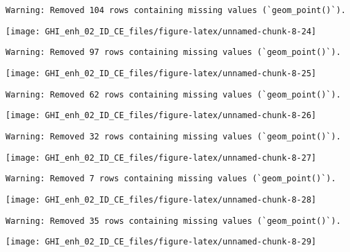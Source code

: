 \documentclass[
  10pt,
  a4paper,oneside]{article}
\begin{document}
\begin{verbatim}
Warning: Removed 104 rows containing missing values (`geom_point()`).
\end{verbatim}

\begin{center}\texttt{[image: GHI\_enh\_02\_ID\_CE\_files/figure-latex/unnamed-chunk-8-24]} \end{center}

\begin{verbatim}
Warning: Removed 97 rows containing missing values (`geom_point()`).
\end{verbatim}

\begin{center}\texttt{[image: GHI\_enh\_02\_ID\_CE\_files/figure-latex/unnamed-chunk-8-25]} \end{center}

\begin{verbatim}
Warning: Removed 62 rows containing missing values (`geom_point()`).
\end{verbatim}

\begin{center}\texttt{[image: GHI\_enh\_02\_ID\_CE\_files/figure-latex/unnamed-chunk-8-26]} \end{center}

\begin{verbatim}
Warning: Removed 32 rows containing missing values (`geom_point()`).
\end{verbatim}

\begin{center}\texttt{[image: GHI\_enh\_02\_ID\_CE\_files/figure-latex/unnamed-chunk-8-27]} \end{center}

\begin{verbatim}
Warning: Removed 7 rows containing missing values (`geom_point()`).
\end{verbatim}

\begin{center}\texttt{[image: GHI\_enh\_02\_ID\_CE\_files/figure-latex/unnamed-chunk-8-28]} \end{center}

\begin{verbatim}
Warning: Removed 35 rows containing missing values (`geom_point()`).
\end{verbatim}

\begin{center}\texttt{[image: GHI\_enh\_02\_ID\_CE\_files/figure-latex/unnamed-chunk-8-29]} \end{center}
\end{document}
